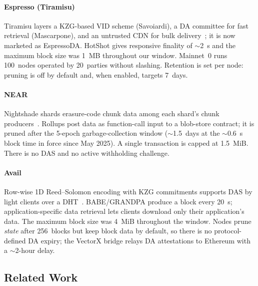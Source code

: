 \paragraph{Espresso (Tiramisu)}
Tiramisu layers a KZG-based VID scheme (Savoiardi), a DA committee for fast retrieval (Mascarpone), and an untrusted CDN for bulk delivery~\cite{Espresso:Hotshot_and_Triamisu}; it is now marketed as EspressoDA.
HotShot gives responsive finality of $\sim$2~s and the maximum block size was 1~MB throughout our window. Mainnet~0 runs 100~nodes operated by 20~parties without slashing. Retention is set per node: pruning is off by default and, when enabled, targets 7~days.

\paragraph{NEAR}
Nightshade shards erasure-code chunk data among each shard's chunk producers~\cite{NEAR_Nightshade_Scaling_Blockchain}.
Rollups post data as function-call input to a blob-store contract; it is pruned after the 5-epoch garbage-collection window ($\sim$1.5~days at the $\sim$0.6~s block time in force since May 2025). A single transaction is capped at 1.5~MiB. There is no DAS and no active withholding challenge.

\paragraph{Avail}
Row-wise 1D Reed--Solomon encoding with KZG commitments supports DAS by light clients over a DHT~\cite{Avail_The_DA_Blockchain}.
BABE/GRANDPA produce a block every 20~s; application-specific data retrieval lets clients download only their application's data.
The maximum block size was 4~MiB throughout the window. Nodes prune \emph{state} after 256~blocks but keep block data by default, so there is no protocol-defined DA expiry; the VectorX bridge relays DA attestations to Ethereum with a $\sim$2-hour delay.


\subsection{Related Work}
\label{subsec:related-work}

